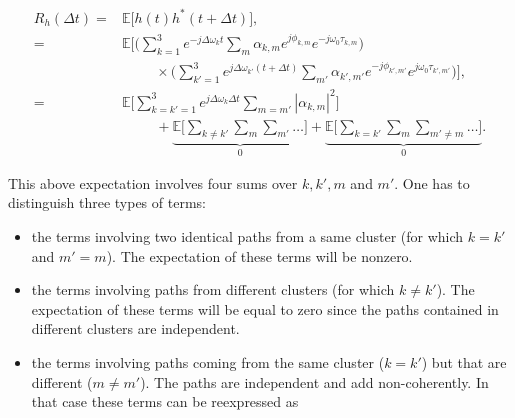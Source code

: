 \documentclass [a4paper, 11pt] {article}
\begin{document}
\begin{solution}
\begin{enumerate}
        \begin{align}
             R_h(\Delta t) =& \mathbb{E}\Big[h(t)h^*(t+\Delta t)\Big],\\
             =& \mathbb{E}\Bigg[\Big( \sum_{k=1}^{3} e^{-j\Delta \omega_{k} t} \sum_m \alpha_{k,m} e^{j\phi_{k,m}} e^{-j\omega_0 \tau_{k,m}} \Big) \\
             &\hspace{1cm}\times \Big( \sum_{k'=1}^{3} e^{j\Delta \omega_{k'} (t+\Delta t)} \sum_{m'} \alpha_{k',m'} e^{-j\phi_{k',m'}} e^{j\omega_0 \tau_{k',m'}} \Big) \Bigg] \nonumber,\\
             =& \mathbb{E}\Bigg[ \sum_{k = k'=1}^{3} e^{j\Delta \omega_{k} \Delta t} \sum_{m = m'} | \alpha_{k,m}|^2 \Bigg]\\
             &\hspace{1cm}+ \underbrace{\mathbb{E}\Bigg[\sum_{k\neq k'} \sum_{m} \sum_{m'} \hdots \Bigg] }_{0}
              + \underbrace{\mathbb{E}\Bigg[ \sum_{k = k'} \sum_{m} \sum_{m'\neq m} \hdots\Bigg] }_{0}.\nonumber
        \end{align}
        
        This above expectation involves four sums over $k,k',m$ and $m'$. One has to distinguish three types of terms: 
        
        \begin{itemize}
            \item the terms involving two identical paths from a same cluster (for which $k=k'$ and $m'=m$). The expectation of these terms will be nonzero.
            \item the terms involving paths from different clusters (for which $k\neq k'$). The expectation of these terms will be equal to zero since the paths contained in different clusters are independent. 
            \item the terms involving paths coming from the same cluster ($k=k'$) but that are different ($m\neq m'$). The paths are independent and add non-coherently. In that case these terms can be reexpressed as 
            

\end{itemize}
\end{enumerate}
\end{solution}
\end{document}
